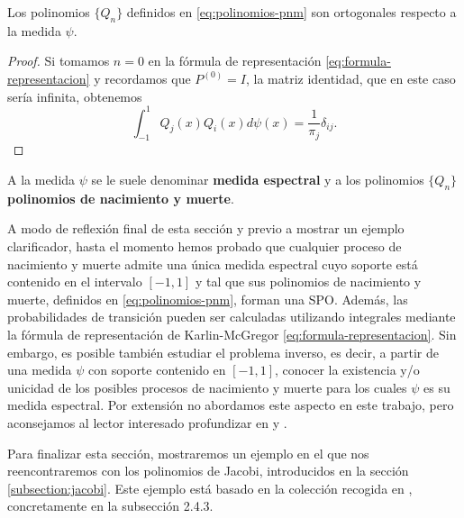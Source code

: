     \begin{corolario}
        Los polinomios $\{Q_n\}$ definidos en \eqref{eq:polinomios-pnm} son ortogonales respecto a la medida $\psi$.
    \end{corolario}
    \begin{proof}
        Si tomamos $n=0$ en la fórmula de representación \eqref{eq:formula-representacion} y recordamos que $P^{(0)}=I$, la matriz identidad, que en este caso sería infinita, obtenemos
        $$
        \int_{-1}^1 Q_j(x)Q_i(x)d\psi(x) = \frac{1}{\pi_j}\delta_{ij}.
        $$
    \end{proof}

    A la medida $\psi$ se le suele denominar \textbf{medida espectral} y a los polinomios $\{Q_n\}$ \textbf{polinomios de nacimiento y muerte}. 

    A modo de reflexión final de esta sección y previo a mostrar un ejemplo clarificador, hasta el momento hemos probado que cualquier proceso de nacimiento y muerte admite una única medida espectral cuyo soporte está contenido en el intervalo $[-1,1]$ y tal que sus polinomios de nacimiento y muerte, definidos en \eqref{eq:polinomios-pnm}, forman una SPO. Además, las probabilidades de transición pueden ser calculadas utilizando integrales mediante la fórmula de representación de Karlin-McGregor \eqref{eq:formula-representacion}. Sin embargo, es posible también estudiar el problema inverso, es decir, a partir de una medida $\psi$ con soporte contenido en $[-1,1]$, conocer la existencia y/o unicidad de los posibles procesos de nacimiento y muerte para los cuales $\psi$ es su medida espectral. Por extensión no abordamos este aspecto en este trabajo, pero aconsejamos al lector interesado profundizar en \cite[Section 2.2]{Manuel} y \cite{random-walks}.

    Para finalizar esta sección, mostraremos un ejemplo en el que nos reencontraremos con los polinomios de Jacobi, introducidos en la sección \ref{subsection:jacobi}. Este ejemplo está basado en la colección recogida en \cite[CH. II, Section 2.4]{Manuel}, concretamente en la subsección 2.4.3.

